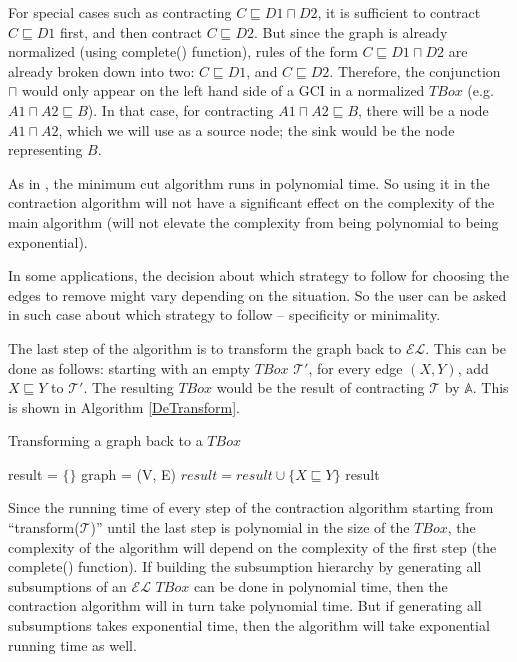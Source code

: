 For special cases such as contracting $C \sqsubseteq D1 \sqcap D2$, it is sufficient to contract $C \sqsubseteq D1$ first, and then contract $C \sqsubseteq D2$. But since the graph is already normalized (using complete() function), rules of the form $C \sqsubseteq D1 \sqcap D2$ are already broken down into two: $C \sqsubseteq D1$, and $C \sqsubseteq D2$. Therefore, the conjunction $\sqcap$ would only appear on the left hand side of a GCI in a normalized $TBox$ (e.g. $A1 \sqcap A2 \sqsubseteq B$). In that case, for contracting $A1 \sqcap A2 \sqsubseteq B$, there will be a node $A1 \sqcap A2$, which we will use as a source node; the sink would be the node representing $B$. 

As in \cite{alg}, the minimum cut algorithm runs in polynomial time. So using it in the contraction algorithm will not have a significant effect on the complexity of the main algorithm (will not elevate the complexity from being polynomial to being exponential). 

In some applications, the decision about which strategy to follow for choosing the edges to remove might vary depending on the situation. So the user can be asked in such case about which strategy to follow -- specificity or minimality. 

The last step of the algorithm is to transform the graph back to $\mathcal{EL}$. This can be done as follows: starting with an empty $TBox$ $\mathcal{T'}$, for every edge $(X, Y)$, add $X \sqsubseteq Y$ to $\mathcal{T'}$. The resulting $TBox$ would be the result of contracting $\mathcal{T}$ by $\mathbb{A}$. This is shown in Algorithm \ref{DeTransform}.

\begin{algorithm}
\caption{Transforming a graph back to a $TBox$}
\label{DeTransform}
\begin{algorithmic}[1]
\State result = $\{\}$
\State graph = (V, E)
\State $result = result \cup \{X \sqsubseteq Y\}$
\EndFor
\State \Return result
\EndFunction
\end{algorithmic}
\end{algorithm}

Since the running time of every step of the contraction algorithm starting from ``transform($ \mathcal{T} $)'' until the last step is polynomial in the size of the $TBox$, the complexity of the algorithm will depend on the complexity of the first step (the complete() function). If building the subsumption hierarchy by generating all subsumptions of an $\mathcal{EL}$ $TBox$ can be done in polynomial time, then the contraction algorithm will in turn take polynomial time. But if generating all subsumptions takes exponential time, then the algorithm will take exponential running time as well.

